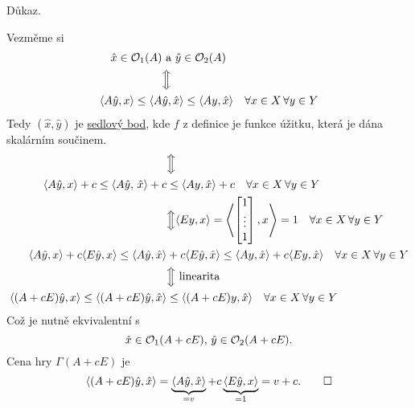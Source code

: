 Důkaz.

Vezměme si
\begin{align*}
    \hat x \in \mathcal{O}_1(A) &\text{ a } \hat y \in \mathcal{O}_2(A) \\
    & \Big\Updownarrow \\
   \langle A \hat y, x\rangle \leq \langle A &\hat y, \hat x\rangle \leq \langle Ay, \hat x\rangle 
   \quad \forall x \in X \, \forall y \in Y
\end{align*}
Tedy $(\hat x, \hat y)$ je \hyperref[sedl]{sedlový bod}, kde $f$ z definice je funkce úžitku, která je dána skalárním 
součinem.
\begin{align*}
    & \Big\Updownarrow \\
    \langle A \hat y, x\rangle + c \leq \langle A \hat y, \, \hat x\rangle + c &\leq \langle Ay, \hat x\rangle + c
    \quad \forall x \in X \, \forall y \in Y \\
    & \Big\Updownarrow \langle Ey, x\rangle = \left\langle \begin{bmatrix}1 \\ \vdots \\ 1\end{bmatrix}, x\right\rangle
    = 1 \quad \forall x \in X \, \forall y \in Y \\
    \langle A \hat y, x\rangle + c \langle E \hat y, x\rangle \leq \langle A \hat y, \hat x\rangle &+ c 
    \langle E \hat y, \hat x\rangle \leq \langle Ay, \hat x\rangle + c \langle Ey, \hat x\rangle 
    \quad \forall x \in X \, \forall y \in Y \\
    & \Big\Updownarrow \text{ linearita} \\
    \langle (A + cE)\hat y, x\rangle \leq \langle (A+cE)\hat y, \hat x\rangle &\leq \langle (A+cE)y, \hat x\rangle
    \quad \forall x \in X \, \forall y \in Y
\end{align*}
Což je nutně ekvivalentní s
\[
    \hat x \in \mathcal{O}_1(A+cE), \, \hat y \in \mathcal{O}_2(A+cE).
\]
Cena hry $\Gamma(A+cE)$ je
\[
    \langle (A+cE)\hat y, \hat x\rangle = \underbrace{\langle A \hat y, \hat x\rangle}_{=v} + 
    c \underbrace{\langle E \hat y, x\rangle}_{=1} = v + c. \qed
\]


